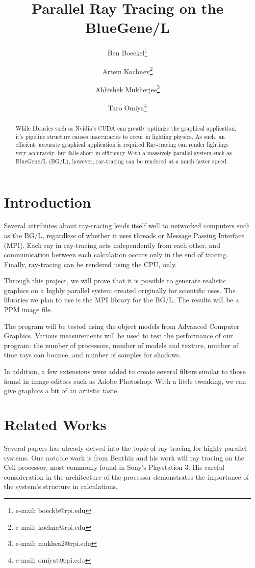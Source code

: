 \documentclass{acmsiggraph}
\title{Parallel Ray Tracing on the BlueGene/L}
\author{%
Ben Boeckel\thanks{e-mail: boeckb@rpi.edu} %
\and Artem Kochnev\thanks{e-mail: kochna@rpi.edu} %
\and Abhishek Mukherjee\thanks{e-mail: mukhea2@rpi.edu} %
\and Taro Omiya\thanks{e-mail: omiyat@rpi.edu}}
\begin{document}
\maketitle


\begin{abstract}
While libraries such as Nvidia's CUDA can greatly optimize the graphical
application, it's pipeline structure causes inaccuracies to occur in lighting
physics.  As such, an efficient, accurate graphical application is required
Ray-tracing can render lightings very accurately, but falls short in efficiency
With a massively parallel system such as BlueGene/L (BG/L), however, ray-tracing can be
rendered at a much faster speed.
\end{abstract}
\keywordlist


\section{Introduction}
Several attributes about ray-tracing lends itself well to networked computers
such as the BG/L, regardless of whether it uses threads or Message
Passing Interface (MPI).  Each ray in ray-tracing acts independently from each
other, and communication between each calculation occurs only in the end of
tracing.  Finally, ray-tracing can be rendered using the CPU, only.

Through this project, we will prove that it is possible to generate realistic
graphics on a highly parallel system created originally for scientific uses.
The libraries we plan to use is the MPI library for the BG/L.
The results will be a PPM image file.

The program will be tested using the object models from Advanced Computer
Graphics.  Various measurements will be used to test the performance of our
program: the number of processors, number of models and texture, number of time
rays can bounce, and number of samples for shadows.

In addition, a few extensions were added to create several filters similar to
those found in image editors such as Adobe Photoshop. With a little tweaking, we
can give graphics a bit of an artistic taste.

\section{Related Works}
Several papers has already delved into the topic of ray tracing for highly
parallel systems.  One notable work is from Benthin and his work will ray
tracing on the Cell processor, most commonly found in Sony's Playstation 3.
His careful consideration in the architecture of the processor demonstrates the
importance of the system's structure in calculations. \cite{benthin2006rtc}
\end{document}
